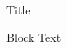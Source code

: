 \documentclass[aspectratio=169,10pt,t,xcolor={table,dvipsnames}]{beamer}
\begin{document}
\begin{frame}{Title}
\begin{block}{Block}
Text
\end{block}
\end{frame}
\end{document}
